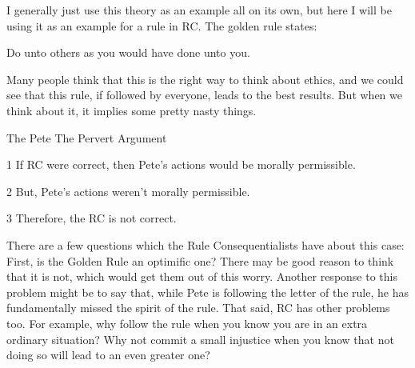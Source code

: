 I generally just use this theory as an example all on its own, but here I will be using it as an example for a rule in RC. The golden rule states:
\begin{center}
Do unto others as you would have done unto you.
\end{center}
Many people think that this is the right way to think about ethics, and we could see that this rule, if followed by everyone, leads to the best results. But when we think about it, it implies some pretty nasty things.

    
The Pete The Pervert Argument
\begin{earg}
    \item[1] If RC were correct, then Pete’s actions would be morally permissible.
    \item[2] But, Pete’s actions weren’t morally permissible.
    \item[3] Therefore, the RC is not correct.
\end{earg}


There are a few questions which the Rule Consequentialists have about this case: First, is the Golden Rule an optimific one? There may be good reason to think that it is not, which would get them out of this worry. Another response to this problem might be to say that, while Pete is following the letter of the rule, he has fundamentally missed the spirit of the rule. That said, RC has other problems too. For example, why follow the rule when you know you are in an extra ordinary situation? Why not commit a small injustice when you know that not doing so will lead to an even greater one?

